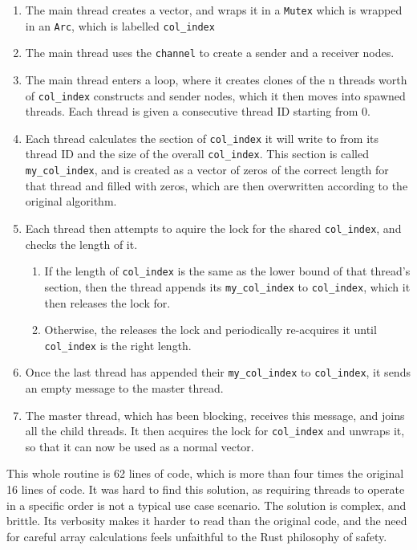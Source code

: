 \begin{enumerate}
    \item The main thread creates a vector, and wraps it in a \texttt{Mutex} which is wrapped in an \texttt{Arc}, which is labelled \texttt{col\_index}
    \item The main thread uses the \texttt{channel} to create a sender and a receiver nodes.
    \item The main thread enters a loop, where it creates clones of the n threads worth of \texttt{col\_index} constructs and sender nodes, which it then moves into spawned threads. Each thread is given a consecutive thread ID starting from 0.
    \item Each thread calculates the section of \texttt{col\_index} it will write to from its thread ID and the size of the overall \texttt{col\_index}. This section is called \texttt{my\_col\_index}, and is created as a vector of zeros of the correct length for that thread and filled with zeros, which are then overwritten according to the original algorithm.
    \item Each thread then attempts to aquire the lock for the shared \texttt{col\_index}, and checks the length of it.
    \begin{enumerate}
        \item If the length of \texttt{col\_index} is the same as the lower bound of that thread's section, then the thread appends its \texttt{my\_col\_index} to \texttt{col\_index}, which it then releases the lock for.
        \item Otherwise, the releases the lock and periodically re-acquires it until \texttt{col\_index} is the right length.
    \end{enumerate}
\item Once the last thread has appended their \texttt{my\_col\_index} to \texttt{col\_index}, it sends an empty message to the master thread.
\item The master thread, which has been blocking, receives this message, and joins all the child threads. It then acquires the lock for \texttt{col\_index} and unwraps it, so that it can now be used as a normal vector.
\end{enumerate}

This whole routine is 62 lines of code, which is more than four times the original 16 lines of code. It was hard to find this solution, as requiring threads to operate in a specific order is not a typical use case scenario. 
The solution is complex, and brittle. Its verbosity makes it harder to read than the original code, and the need for careful array calculations feels unfaithful to the Rust philosophy of safety.

